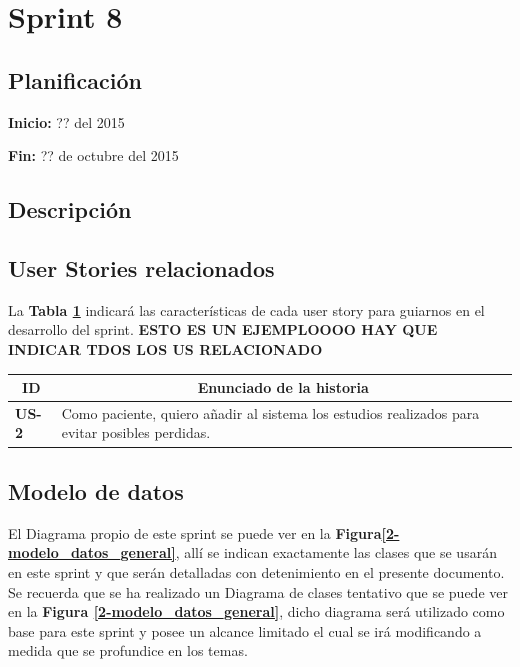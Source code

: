 \documentclass[a4paper,12pt]{article}
\begin{document}

\section{Sprint 8} %

\subsection{Planificación}

\textbf{Inicio: }?? del 2015 

\textbf{Fin:} ?? de octubre del 2015



\subsection{Descripción}

\subsection{User Stories relacionados}
La \textbf{Tabla \ref{US-Sprint3} } indicará las características de cada user story para guiarnos en el desarrollo del sprint.
\textbf{ESTO ES UN EJEMPLOOOO HAY QUE INDICAR TDOS LOS US RELACIONADO}
\begin{table}[h]
    \label{US-Sprint3}
    \centering
	\begin{tabular}{|l|p{9cm}|}
	\hline
        \multicolumn{1}{|c|}{\textbf{ID}} &
        \multicolumn{1}{|c|}{\textbf{Enunciado de la historia}} \\          
    \hline
        \textbf{US-2 } & Como paciente, quiero añadir al sistema los estudios realizados para evitar posibles perdidas.\\
     \hline 
     
    \end{tabular}

\end{table}

\subsection{Modelo de datos}
El Diagrama propio de este sprint se puede ver en la \textbf{Figura\ref{2-modelo_datos_general}}, allí se indican exactamente las clases que se usarán en este sprint y que serán detalladas con detenimiento en el presente documento. Se recuerda que se ha realizado un Diagrama de clases tentativo que se puede ver en la \textbf{Figura \ref{2-modelo_datos_general}}, dicho diagrama  será utilizado como base para este sprint y posee un alcance limitado el cual se irá modificando a medida que se profundice en los temas.
\end{document}
